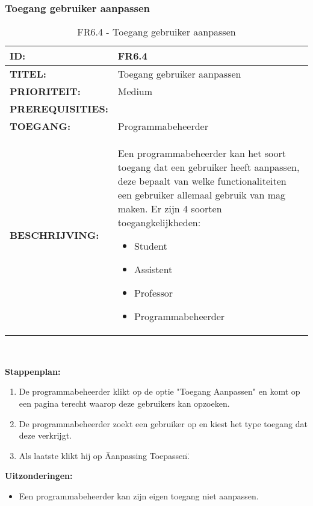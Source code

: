 \subsubsection{Toegang gebruiker aanpassen }
\noindent\begin{table}[H]
            \begin{tabular}{l | p{10cm}}
                \textbf{ID:} & FR6.4 \\ \hline
                \textbf{TITEL:} & Toegang gebruiker aanpassen \\ \hline
                \textbf{PRIORITEIT:} &  Medium \\ \hline
                \textbf{PREREQUISITIES:} & \\ \hline
                \textbf{TOEGANG:} & Programmabeheerder \\ \hline
                \textbf{BESCHRIJVING:} & Een programmabeheerder kan het soort toegang dat een gebruiker heeft aanpassen, deze bepaalt van welke functionaliteiten een gebruiker allemaal gebruik van mag maken. Er zijn 4 soorten toegangkelijkheden: 
                \begin{itemize}
                		\item Student
                		\item Assistent
                		\item Professor
                		\item Programmabeheerder
                \end{itemize}
            \end{tabular}\\
            \caption{FR6.4 - Toegang gebruiker aanpassen }
            \label{tab:FR6.4 - Toegang gebruiker aanpassen }
        \end{table}   

\textbf{Stappenplan:}
	\begin{enumerate}
	\item De programmabeheerder klikt op de optie "Toegang Aanpassen" en komt op een pagina terecht waarop deze gebruikers kan opzoeken.
	\item De programmabeheerder zoekt een gebruiker op en kiest het type toegang dat deze verkrijgt.
	\item Als laatste klikt hij op \"Aanpassing Toepassen\".
	\end{enumerate}	
	
\textbf{Uitzonderingen:}
\begin{itemize}
\item Een programmabeheerder kan zijn eigen toegang niet aanpassen.
\end{itemize}


